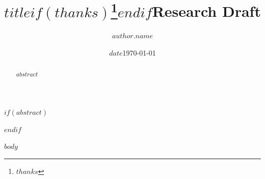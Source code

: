 \documentclass{amsart}
\title{$title$$if(thanks)$\thanks{$thanks$}$endif$}
\title{Research Draft}
\date{$date$}
\date{\today}
\author{$author.name$}
\begin{document}
$if(abstract)$
\begin{abstract}
    $abstract$
\end{abstract}
$endif$

\maketitle
\tableofcontents

\newpage

$body$

\clearpage
 \printbibliography
\end{document}
